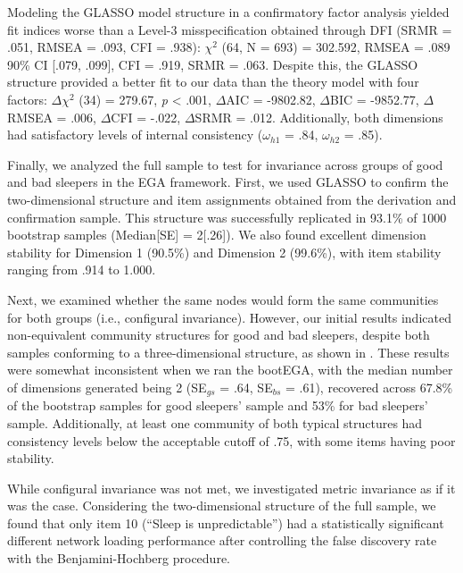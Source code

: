 \documentclass[
  12pt,
  twoside,
  openright,
  a4paper,
  chapter=TITLE,
  section=TITLE,
  brazil]{abntex2}
\begin{document}
Modeling the GLASSO model structure in a confirmatory factor analysis
yielded fit indices worse than a Level-3 misspecification obtained
through DFI (SRMR = .051, RMSEA = .093, CFI = .938): \(\chi^2\) (64, N =
693) = 302.592, RMSEA = .089 90\% CI {[}.079, .099{]}, CFI = .919, SRMR
= .063. Despite this, the GLASSO structure provided a better fit to our
data than the theory model with four factors: \(\Delta\chi^2\) (34) =
279.67, \emph{p} \textless{} .001, \(\Delta\)AIC = -9802.82,
\(\Delta\)BIC = -9852.77, \(\Delta\)RMSEA = .006, \(\Delta\)CFI = -.022,
\(\Delta\)SRMR = .012. Additionally, both dimensions had satisfactory
levels of internal consistency (\(\omega_{h1}\) = .84, \(\omega_{h2}\) =
.85).

Finally, we analyzed the full sample to test for invariance across
groups of good and bad sleepers in the EGA framework. First, we used
GLASSO to confirm the two-dimensional structure and item assignments
obtained from the derivation and confirmation sample. This structure was
successfully replicated in 93.1\% of 1000 bootstrap samples
(Median{[}SE{]} = 2{[}.26{]}). We also found excellent dimension
stability for Dimension 1 (90.5\%) and Dimension 2 (99.6\%), with item
stability ranging from .914 to 1.000.

Next, we examined whether the same nodes would form the same communities
for both groups (i.e., configural invariance). However, our initial
results indicated non-equivalent community structures for good and bad
sleepers, despite both samples conforming to a three-dimensional
structure, as shown in \textcite{fs-plots}. These results were somewhat
inconsistent when we ran the bootEGA, with the median number of
dimensions generated being 2 (SE\(_{gs}\) = .64, SE\(_{bs}\) = .61),
recovered across 67.8\% of the bootstrap samples for good sleepers'
sample and 53\% for bad sleepers' sample. Additionally, at least one
community of both typical structures had consistency levels below the
acceptable cutoff of .75, with some items having poor stability.

While configural invariance was not met, we investigated metric
invariance as if it was the case. Considering the two-dimensional
structure of the full sample, we found that only item 10 (``Sleep is
unpredictable'') had a statistically significant different network
loading performance after controlling the false discovery rate with the
Benjamini-Hochberg procedure.
\end{document}
